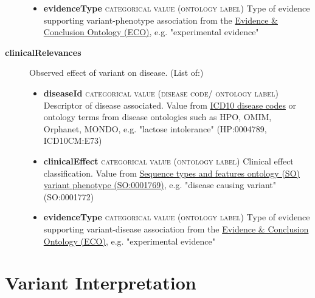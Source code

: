 \documentclass[a4paper, 10pt]{article}        %
\begin{document}
\begin{description}
\begin{itemize}
				\item[] \textbf{evidenceType} {\textsc{categorical value (ontology label)}} Type of evidence supporting variant-phenotype association from the \href{http://purl.obolibrary.org/obo/eco.owl}{Evidence \& Conclusion Ontology (ECO)}, e.g. "experimental evidence"
	\end{itemize} 
\item[\textbf{clinicalRelevances}] Observed effect of variant on disease. (List of:)
	\begin{itemize}
				\item[] \textbf{diseaseId} {\textsc{categorical value (disease code/ ontology label)}} Descriptor of disease associated. Value from \href{https://www.who.int/classifications/icd/en/}{ICD10 disease codes} or ontology terms from disease ontologies such as HPO, OMIM, Orphanet, MONDO, e.g. "lactose intolerance" (HP:0004789, ICD10CM:E73)
				\item[]  \textbf{clinicalEffect} {\textsc{categorical value (ontology label)}} Clinical effect classification. Value from \href{http://purl/obolibrary.org/obo/SO_0001769}{Sequence types and features ontology (SO) variant phenotype (SO:0001769)}, e.g. "disease causing variant" (SO:0001772)
				\item[]  \textbf{evidenceType} {\textsc{categorical value (ontology label)}} Type of evidence supporting variant-disease association from the \href{http://purl.obolibrary.org/obo/eco.owl}{Evidence \& Conclusion Ontology (ECO)}, e.g. "experimental evidence"
	\end{itemize} 
 \end{description}
 
 
 
    	
\section*{ {\color{teal} Variant Interpretation}}
  
\end{document}
